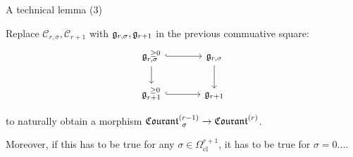 \documentclass[beamer,10pt]{standalone}
\begin{document}
\begin{frame}{A technical lemma (3)}
	\begin{upshotblock}
	  Replace $\mathcal{C}_{r,\sigma}, \mathcal{C}_{r+1}$ with $\g_{r,\sigma}, \g_{r+1}$ in the previous commuative square:
		\begin{displaymath}
			\begin{tikzcd}[ampersand replacement=\&, column sep = large]
				\g_{r,\sigma}^{~\geq 0} \ar[r,hook] \ar[d, ]
				\& \g_{r,\sigma} \ar[d, ]
				\\
				\g_{r+1}^{~\geq 0} \ar[r,hook] \& \g_{r+1}
			\end{tikzcd}
		\end{displaymath}
		\medskip

		to naturally obtain a morphism $\Courant[\sigma]{r-1} \to \Courant{r}$.
	\end{upshotblock}
	\vfill

	Moreover, if this has to be true for any $\sigma \in \Omega^{r+1}_{\mathrm{cl}}$, it has to be true for $\sigma = 0$.... 
\end{frame}
\end{document}

